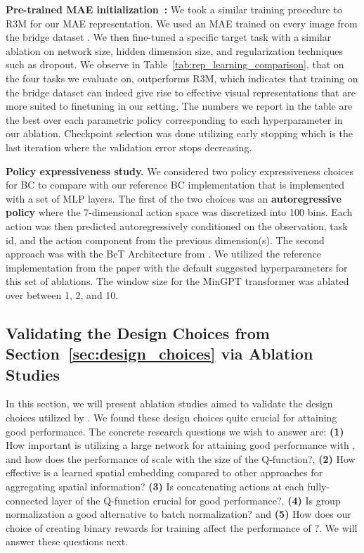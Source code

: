 \documentclass[conference]{IEEEtran}
\begin{document}
\textbf{Pre-trained MAE initialization~\citep{he2111masked}:}
We took a similar training procedure to R3M for our MAE representation. We used an MAE trained on every image from the bridge dataset \citet{ebert2021bridge}. We then fine-tuned a specific target task with a similar ablation on network size, hidden dimension size, and regularization techniques such as dropout.  We observe in Table~\ref{tab:rep_learning_comparison}, that on the four tasks we evaluate on, \methodname outperforms R3M, which indicates that training on the bridge dataset can indeed give rise to effective visual representations that are more suited to finetuning in our setting. The numbers we report in the table are the best over each parametric policy corresponding to each hyperparameter in our ablation. Checkpoint selection was done utilizing early stopping which is the last iteration where the validation error stops decreasing. 

\textbf{Policy expressiveness study.}
We considered two policy expressiveness choices for BC to compare with our reference BC implementation that is implemented with a set of MLP layers. The first of the two choices was an \textbf{autoregressive policy} where the 7-dimensional action space was discretized into 100 bins. Each action was then predicted autoregressively conditioned on the observation, task id, and the action component from the previous dimension(s). The second approach was with the BeT Architecture from \citet{shafiullah2022behavior}. We utilized the reference implementation from the paper with the default suggested hyperparameters for this set of ablations. The window size for the MinGPT transformer was ablated over between 1, 2, and 10.

\subsection{Validating the Design Choices from Section~\ref{sec:design_choices} via Ablation Studies}
\label{app:design}

In this section, we will present ablation studies aimed to validate the design choices utilized by \methodname. We found these design choices quite crucial for attaining good performance. The concrete research questions we wish to answer are: \textbf{(1)} How important is utilizing a large network for attaining good performance with \methodname, and how does the performance of \methodname scale with the size of the Q-function?, \textbf{(2)} How effective is a learned spatial embedding compared to other approaches for aggregating spatial information? \textbf{(3)} Is concatenating actions at each fully-connected layer of the Q-function crucial for good performance?, \textbf{(4)} Is group normalization a good alternative to batch normalization? and \textbf{(5)} How does our choice of creating binary rewards for training affect the performance of \methodname?. We will answer these questions next.
\end{document}
